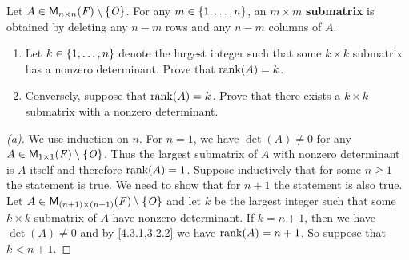 \begin{ex}\label{ex:4.3.23}
	Let \(A \in \ms[n][n][\F] \setminus \set{\zm}\).
	For any \(m \in \left\lbrace1, \dots, n\right\rbrace\), an \(m \times m\) \textbf{submatrix} is obtained by deleting any \(n - m\) rows and any \(n - m\) columns of \(A\).
	\begin{enumerate}
		\item Let \(k \in \left\lbrace1, \dots, n\right\rbrace\) denote the largest integer such that some \(k \times k\) submatrix has a nonzero determinant.
		      Prove that \(\rk{A} = k\).
		\item Conversely, suppose that \(\rk{A} = k\).
		      Prove that there exists a \(k \times k\) submatrix with a nonzero determinant.
	\end{enumerate}
\end{ex}

\begin{proof}[(a)]
	We use induction on \(n\).
	For \(n = 1\), we have \(\det(A) \neq 0\) for any \(A \in \ms[1][1][\F] \setminus \set{\zm}\).
	Thus the largest submatrix of \(A\) with nonzero determinant is \(A\) itself and therefore \(\rk{A} = 1\).
	Suppose inductively that for some \(n \geq 1\) the statement is true.
	We need to show that for \(n + 1\) the statement is also true.
	Let \(A \in \ms[(n + 1)][(n + 1)][\F] \setminus \set{\zm}\) and let \(k\) be the largest integer such that some \(k \times k\) submatrix of \(A\) have nonzero determinant.
	If \(k = n + 1\), then we have \(\det(A) \neq 0\) and by \cref{4.3.1,3.2.2} we have \(\rk{A} = n + 1\).
	So suppose that \(k < n + 1\).


\end{proof}
